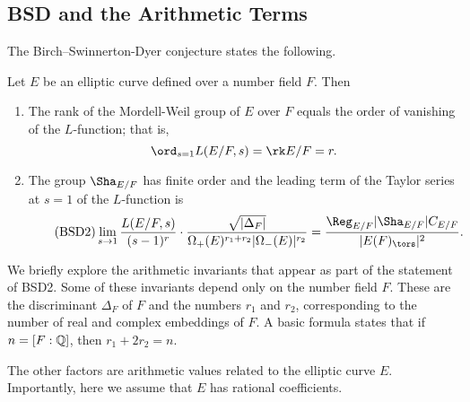 \subsection{BSD and the Arithmetic Terms}\label{sec-explain-terms}

The Birch--Swinnerton-Dyer conjecture states the following.

\begin{conj}[BSD]
    Let $E$ be an elliptic curve defined over a number field $F$. Then 
    \begin{enumerate}[label={\bfseries  BSD\arabic*.}]
        \item The rank of the Mordell-Weil group of $E$ over $F$ equals the order of vanishing of the $L$-function; that is,
        $$\ord_{s=1}L(E/F,s)=\rk E/F = r.$$
        \item The group $\Sha_{E / F}$ has finite order and the leading term of the Taylor series at $s=1$ of the $L$-function is
        \begin{equation}\label{BSD_2}\tag{BSD2}
            \lim_{s\to1}\frac{L(E/F,s)}{(s-1)^r}\cdot\frac{\sqrt{|\Delta_F|}}{\Omega_+(E)^{r_1+r_2}|\Omega_-(E)|^{r_2}}=\frac{\Reg_{E/F}|\Sha_{E/F}|C_{E/F}}{|E(F)_{\tors}|^2}.
        \end{equation}
    \end{enumerate}
\end{conj}

We briefly explore the arithmetic invariants that appear as part of the statement of BSD2. Some of these invariants depend only on the number field $F$. These are the discriminant $\Delta_F$ of $F$ and the numbers $r_1$ and $r_2$, corresponding to the number of real and complex embeddings of $F$. A basic formula states that if $n=[F:\mathbb{Q}]$, then $r_1+2r_2=n$. 

The other factors are arithmetic values related to the elliptic curve $E$. Importantly, here we assume that $E$ has rational coefficients.

